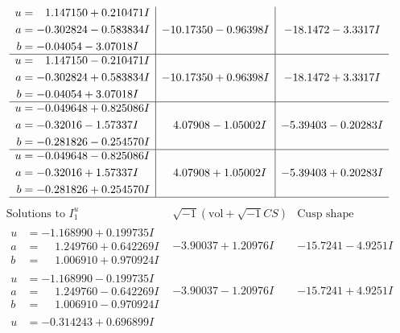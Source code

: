 \documentclass[1p]{elsarticle_modified}
\theoremstyle{definition}
\newcommand{\I}{\sqrt{-1}}
\begin{document}
$$\begin{array}{c|c|c}
\begin{aligned}
u &= \phantom{-}1.147150 + 0.210471 I \\
a &= -0.302824 - 0.583834 I \\
b &= -0.04054 - 3.07018 I\end{aligned}
 & -10.17350 - 0.96398 I & -18.1472 - 3.3317 I \\ \hline\begin{aligned}
u &= \phantom{-}1.147150 - 0.210471 I \\
a &= -0.302824 + 0.583834 I \\
b &= -0.04054 + 3.07018 I\end{aligned}
 & -10.17350 + 0.96398 I & -18.1472 + 3.3317 I \\ \hline\begin{aligned}
u &= -0.049648 + 0.825086 I \\
a &= -0.32016 - 1.57337 I \\
b &= -0.281826 - 0.254570 I\end{aligned}
 & \phantom{-}4.07908 - 1.05002 I & -5.39403 - 0.20283 I \\ \hline\begin{aligned}
u &= -0.049648 - 0.825086 I \\
a &= -0.32016 + 1.57337 I \\
b &= -0.281826 + 0.254570 I\end{aligned}
 & \phantom{-}4.07908 + 1.05002 I & -5.39403 + 0.20283 I\\
 \hline 
 \end{array}$$\newpage$$\begin{array}{c|c|c}  
\text{Solutions to }I^u_{1}& \I (\text{vol} + \sqrt{-1}CS) & \text{Cusp shape}\\
 \hline 
\begin{aligned}
u &= -1.168990 + 0.199735 I \\
a &= \phantom{-}1.249760 + 0.642269 I \\
b &= \phantom{-}1.006910 + 0.970924 I\end{aligned}
 & -3.90037 + 1.20976 I & -15.7241 - 4.9251 I \\ \hline\begin{aligned}
u &= -1.168990 - 0.199735 I \\
a &= \phantom{-}1.249760 - 0.642269 I \\
b &= \phantom{-}1.006910 - 0.970924 I\end{aligned}
 & -3.90037 - 1.20976 I & -15.7241 + 4.9251 I \\ \hline\begin{aligned}
u &= -0.314243 + 0.696899 I \\

\end{aligned}
\end{array}$$
\end{document}

